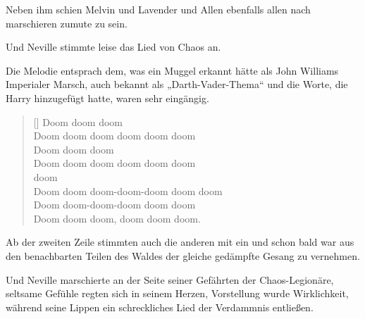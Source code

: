 Neben ihm schien Melvin und Lavender und Allen ebenfalls allen nach marschieren zumute zu sein.

Und Neville stimmte leise das Lied von Chaos an.

Die Melodie entsprach dem, was ein Muggel erkannt hätte als John Williams Imperialer Marsch, auch bekannt als „Darth-Vader-Thema“ und die Worte, die Harry hinzugefügt hatte, waren sehr eingängig.%

\baselineskip\settowidth{\versewidth}{Doom doom doom-doom-doom doom doom} \begin{verse}[\versewidth] Doom doom doom\\ Doom doom doom doom doom doom\\ Doom doom doom\\ Doom doom doom doom doom doom\\  doom \\ Doom doom doom-doom-doom doom doom\\ Doom doom-doom-doom doom doom\\ Doom doom doom, doom doom doom.
\end{verse}\baselineskip

Ab der zweiten Zeile stimmten auch die anderen mit ein und schon bald war aus den benachbarten Teilen des Waldes der gleiche gedämpfte Gesang zu vernehmen.

Und Neville marschierte an der Seite seiner Gefährten der Chaos-Legionäre, seltsame Gefühle regten sich in seinem Herzen, Vorstellung wurde Wirklichkeit, während seine Lippen ein schreckliches Lied der Verdammnis entließen.

